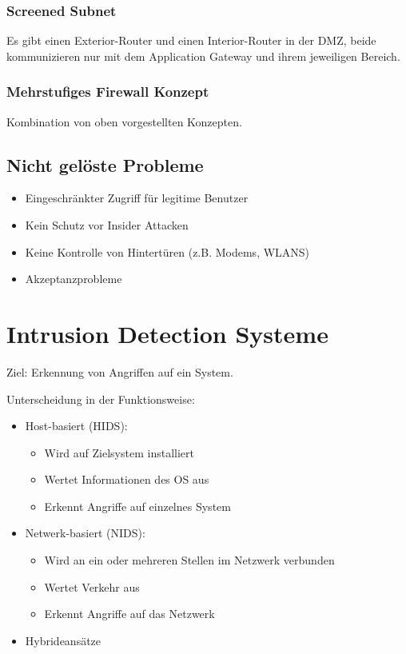 \subsubsection{Screened Subnet}
Es gibt einen Exterior-Router und einen Interior-Router in der DMZ, beide kommunizieren nur mit dem Application Gateway und ihrem jeweiligen Bereich.

\subsubsection{Mehrstufiges Firewall Konzept}
Kombination von oben vorgestellten Konzepten.

\subsection{Nicht gelöste Probleme}
\begin{itemize}
    \item Eingeschränkter Zugriff für legitime Benutzer
    \item Kein Schutz vor Insider Attacken
    \item Keine Kontrolle von Hintertüren (z.B. Modems, WLANS)
    \item Akzeptanzprobleme
\end{itemize}

\section{Intrusion Detection Systeme}
Ziel: Erkennung von Angriffen auf ein System.

\vspace{.3cm}

Unterscheidung in der Funktionsweise:
\begin{itemize}
    \item Host-basiert (HIDS):
        \begin{itemize}
            \item Wird auf Zielsystem installiert
            \item Wertet Informationen des OS aus
            \item Erkennt Angriffe auf einzelnes System
        \end{itemize}
    \item Netwerk-basiert (NIDS):
        \begin{itemize}
            \item Wird an ein oder mehreren Stellen im Netzwerk verbunden
            \item Wertet Verkehr aus
            \item Erkennt Angriffe auf das Netzwerk
        \end{itemize} 
    \item Hybrideansätze
\end{itemize}

